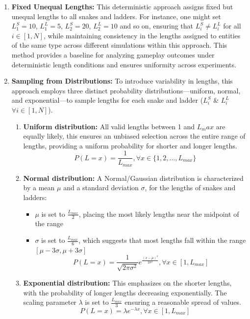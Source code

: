 \begin{enumerate}
	\item \textbf{Fixed Unequal Lengths:} This deterministic approach assigns fixed but unequal lengths to all snakes and ladders. For instance, one might set $L^S_1 = 10$, $L^L_1 = 5$, $L^S_2 = 20$, $L^L_2 = 10$ and so on, ensuring that $L^S_i \neq L^L_i$ for all $i \in [1,N]$, while maintaining consistency in the lengths assigned to entities of the same type across different simulations within this approach. This method provides a baseline for analyzing gameplay outcomes under deterministic length conditions and ensures uniformity across experiments.
	
	\item \textbf{Sampling from Distributions:} To introduce variability in lengths, this approach employs three distinct probability distributions—uniform, normal, and exponential—to sample lengths for each snake and ladder ($L^S_i$ \& $L^L_i$ $\forall i \in [1, N]$).
	
	\begin{enumerate}
		\item \textbf{Uniform distribution: }All valid lengths between 1 and $L_max$ are equally likely, this ensures an unbiased selection across the entire range of lengths, providing a uniform probability for shorter and longer lengths.
		$$P(L=x)=\frac{1}{L_{max}}, \forall x \in \{1,2,\ldots,L_{max}\}$$
		\item \textbf{Normal distribution:} A Normal/Gaussian distribution is characterized by a mean $\mu$ and a standard deviation $\sigma$, for the lengths of snakes and ladders:
		\begin{itemize}
			\item $\mu$ is set to $\frac{L_{max}}{2}$, placing the most likely lengths near the midpoint of the range
			\item $\sigma$ is set to $\frac{L_{max}}{6}$, which suggests that most lengths fall within the range $[\mu-3\sigma, \mu+3\sigma]$
			$$P(L=x) = \frac{1}{\sqrt{2\pi\sigma^2}}{e^{\frac{(x-\mu)^2}{2\sigma^2}}, \forall x\in[1, L_{max}]}$$
		\end{itemize}
		\item \textbf{Exponential distribution: }This emphasizes on the shorter lengths, with the probability of longer lengths decreasing exponentially. The scaling parameter $\lambda$ is set to $\frac{L_{max}}{3}$ ensuring a reasonable spread of values.
		$$P(L=x)={\lambda}e^{{-\lambda}x}, \forall x \in [1, L_{max}]$$
	\end{enumerate}
	

\end{enumerate}
